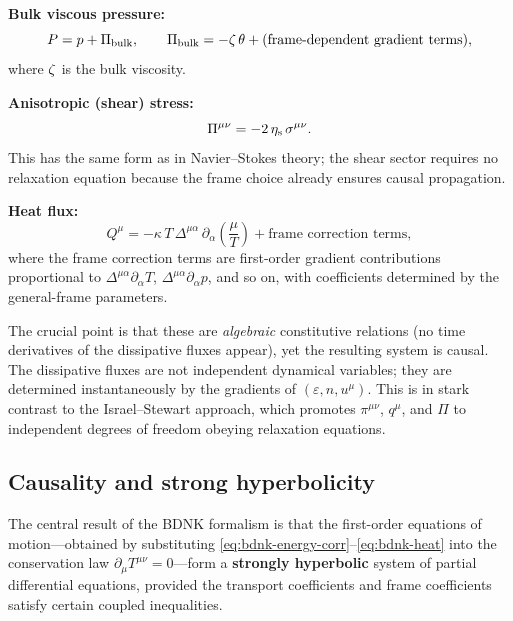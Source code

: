 \medskip\noindent
\textbf{Bulk viscous pressure:}
\begin{equation}
  P = p + \Pi_{\mathrm{bulk}},
  \qquad
  \Pi_{\mathrm{bulk}} = -\zeta\,\theta
    + \text{(frame-dependent gradient terms)},
  \label{eq:bdnk-bulk}
\end{equation}
where $\zeta$ is the bulk viscosity.

\medskip\noindent
\textbf{Anisotropic (shear) stress:}
\begin{equation}
  \Pi^{\mu\nu} = -2\,\eta_{\mathrm{s}}\,\sigma^{\mu\nu}.
  \label{eq:bdnk-shear}
\end{equation}
This has the same form as in Navier--Stokes theory; the shear sector
requires no relaxation equation because the frame choice already
ensures causal propagation.

\medskip\noindent
\textbf{Heat flux:}
\begin{equation}
  Q^{\mu} = -\kappa\, T\,\Delta^{\mu\alpha}\,
    \partial_{\alpha}\!\left(\frac{\mu}{T}\right)
    + \text{frame correction terms},
  \label{eq:bdnk-heat}
\end{equation}
where the frame correction terms are first-order gradient
contributions proportional to $\Delta^{\mu\alpha}\partial_{\alpha}T$,
$\Delta^{\mu\alpha}\partial_{\alpha}p$, and so on, with coefficients
determined by the general-frame parameters.

\medskip
The crucial point is that these are \emph{algebraic} constitutive
relations (no time derivatives of the dissipative fluxes appear), yet
the resulting system is causal.  The dissipative fluxes are not
independent dynamical variables; they are determined instantaneously
by the gradients of $(\varepsilon, n, u^{\mu})$.  This is in stark
contrast to the Israel--Stewart approach, which promotes
$\pi^{\mu\nu}$, $q^{\mu}$, and $\Pi$ to independent degrees of
freedom obeying relaxation equations.

\subsection{Causality and strong hyperbolicity}
\label{sec:bdnk-causality}

The central result of the BDNK formalism is that the first-order
equations of motion---obtained by substituting
\eqref{eq:bdnk-energy-corr}--\eqref{eq:bdnk-heat} into the
conservation law $\partial_{\mu}T^{\mu\nu} = 0$---form a
\textbf{strongly hyperbolic} system of partial differential equations,
provided the transport coefficients and frame coefficients satisfy
certain coupled inequalities.

